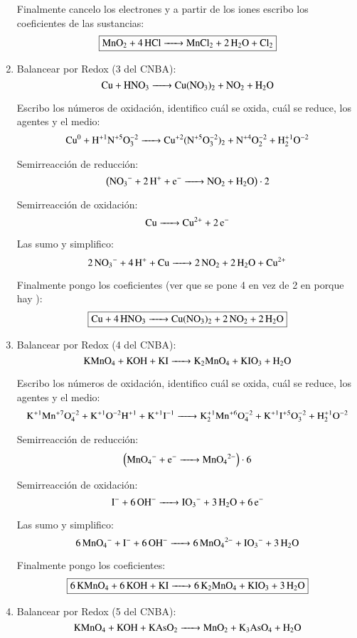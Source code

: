 \begin{enumerate}
Finalmente cancelo los electrones y a partir de los iones escribo los coeficientes de las sustancias:
$$\fbox{\ce{MnO_2 + 4HCl -> MnCl_2 + 2H_2O + Cl_2}}$$


\item
Balancear por Redox (3 del CNBA):
$$\ce{
Cu + HNO3 ->
Cu(NO3)2 + NO2 + H2O
}$$

Escribo los números de oxidación, identifico cuál se oxida, cuál se reduce, los agentes y el medio:
$$\ce{
Cu^0 + H^{+1}N^{+5}O^{-2}3 ->
Cu^{+2}(N^{+5}O^{-2}3)2 + N^{+4}O^{-2}2 + H^{+1}2O^{-2}
}$$


\begin{multicols}{2}
Semirreacción de reducción:
$$\left(\ce{
NO3^{-} + 2H^+ + e^- ->
NO2 + H2O
}\right)\cdot 2$$

Semirreacción de oxidación:
$$\ce{
Cu ->
Cu^{2+} + 2e^-
}$$
\end{multicols}

Las sumo y simplifico:
$$\ce{
2NO3^{-} + 4H^+ + Cu ->
2NO2 + 2 H2O + Cu^{2+}
}$$

Finalmente pongo los coeficientes (ver que se pone 4 en vez de 2 en  porque hay ):
$$\fbox{\ce{
Cu + 4HNO3 ->
Cu(NO3)2 + 2NO2 + 2H2O
}}$$


\newpage
\item
Balancear por Redox (4 del CNBA):
$$\ce{
KMnO4 + KOH + KI ->
K2MnO4 + KIO3 + H2O
}$$

Escribo los números de oxidación, identifico cuál se oxida, cuál se reduce, los agentes y el medio:
\[\ce{
K^{+1}Mn^{+7}O^{-2}4 + K^{+1}O^{-2}H^{+1} + K^{+1}I^{-1} ->
K^{+1}2Mn^{+6}O^{-2}4 + K^{+1}I^{+5}O^{-2}3 + H^{+1}2O^{-2}
}\]


\begin{multicols}{2}
Semirreacción de reducción:
$$\left(\ce{
MnO4^- +e^- ->
MnO4^{2-}
}\right)\cdot 6$$

Semirreacción de oxidación:
$$\ce{
I^{-} + 6OH^- ->
IO3^- + 3H2O + 6e^-
}$$
\end{multicols}

Las sumo y simplifico:
$$\ce{
6MnO4^- + I^- + 6OH^- ->
6MnO4^{2-} + IO3^- + 3H2O
}$$

Finalmente pongo los coeficientes:
$$\fbox{\ce{
6KMnO4 + 6KOH + KI ->
6K2MnO4 + KIO3 + 3H2O
}}$$


\item
Balancear por Redox (5 del CNBA):
$$\ce{
KMnO4 + KOH + KAsO2 ->
MnO2 + K3AsO4 + H2O
}$$


\end{enumerate}
